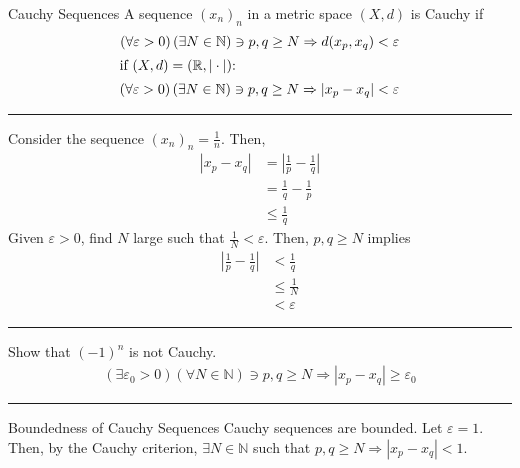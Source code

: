 \documentclass[8pt]{extarticle}
\newcommand{\N}{\mathbb{N}}
\newcommand{\R}{\mathbb{R}}
\begin{document}
  \begin{problem}{Cauchy Sequences}
    A sequence $(x_n)_n$ in a metric space $(X,d)$ is Cauchy if 
    \begin{align*}
      \left(\forall \varepsilon > 0\right)\left(\exists N\in\N\right) \ni p,q\geq N \Rightarrow d(x_p,x_q) < \varepsilon\\
      \shortintertext{if $(X,d) = (\R,|\cdot|)$:}
      \left(\forall \varepsilon > 0\right)\left(\exists N\in\N\right) \ni p,q\geq N \Rightarrow |x_p-x_q| < \varepsilon
    \end{align*}
    \vspace{4pt}
    \rule{\textwidth}{0.4pt}
    \vspace{4pt}
    Consider the sequence $(x_n)_n = \frac{1}{n}$. Then,
    \begin{align*}
      |x_p - x_q| &= \left|\frac{1}{p}-\frac{1}{q}\right|\\
                  &= \frac{1}{q}-\frac{1}{p}\\
                  &\leq \frac{1}{q}
    \end{align*}
    Given $\varepsilon > 0$, find $N$ large such that $\frac{1}{N}< \varepsilon$. Then, $p,q\geq N$ implies
    \begin{align*}
      \left|\frac{1}{p}-\frac{1}{q}\right|& < \frac{1}{q}\\
                                          &\leq \frac{1}{N}\\
                                          &< \varepsilon
    \end{align*}
    \vspace{4pt}
    \rule{\textwidth}{0.4pt}
    \vspace{4pt}
    Show that $(-1)^n$ is not Cauchy.
    \begin{align*}
      \left(\exists \varepsilon_0 > 0\right)\left(\forall N\in\N\right) \ni p,q\geq N \Rightarrow |x_p - x_q| \geq \varepsilon_0
    \end{align*}
    \vspace{4pt}
    \rule{\textwidth}{0.4pt}
    \vspace{4pt}
    \begin{problem}{Boundedness of Cauchy Sequences}
      Cauchy sequences are bounded.
      \tcblower
      Let $\varepsilon = 1$. Then, by the Cauchy criterion, $\exists N\in\N$ such that $p,q\geq N \Rightarrow |x_p-x_q| < 1$.\\


\end{problem}
\end{problem}
\end{document}

